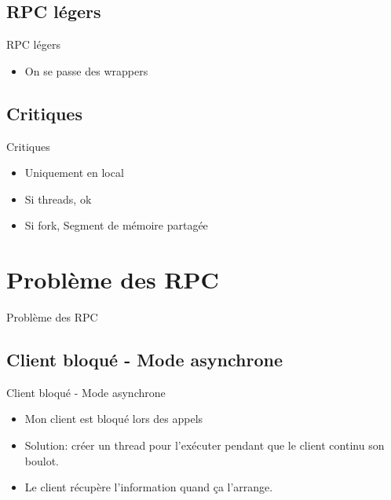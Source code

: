 \begin{frame}{\sectitle}
    \def\subsectitle{RPC légers}
    \subsection{\subsectitle}
    \begin{block}{\subsectitle}
        \begin{itemize}
            \item On se passe des wrappers
        \end{itemize}
    \end{block}
    \def\subsectitle{Critiques}
    \subsection{\subsectitle}
    \begin{block}{\subsectitle}
        \begin{itemize}
            \item Uniquement en local
            \item Si threads, ok 
            \item Si fork, Segment de mémoire partagée
        \end{itemize}
    \end{block}
\end{frame}

\def\sectitle{Problème des RPC}
\section{\sectitle}
\begin{frame}{\sectitle}
    \def\subsectitle{Client bloqué - Mode asynchrone}
    \subsection{\subsectitle}
    \begin{block}{\subsectitle}
        \begin{itemize}
            \item Mon client est bloqué lors des appels
            \item Solution: créer un thread pour l'exécuter pendant que le
                client continu son boulot.
            \item Le client récupère l'information quand ça l'arrange.
        \end{itemize}
    \end{block}
\end{frame}

